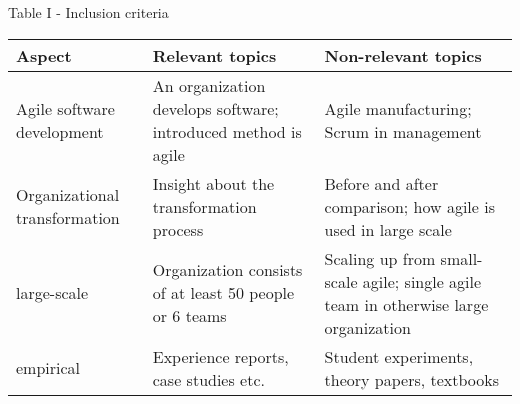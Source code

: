 \centering
Table I - Inclusion criteria

\begin{tabular}{p{10em} p{16em} p{16em}}
	\bfseries{Aspect} & \bfseries{Relevant topics} & \bfseries{Non-relevant topics} \\
	\hline
	Agile software development & An organization develops software; introduced
	method is agile & Agile manufacturing; Scrum in management \\
	\hline
	Organizational transformation & Insight about the transformation process &
	Before and after comparison; how agile is used in large scale \\
	\hline
	large-scale & Organization consists of at least 50 people or 6 teams &
	Scaling up from small-scale agile; single agile team in otherwise large
	organization \\
	\hline
	empirical & Experience reports, case studies etc. & Student experiments,
	theory papers, textbooks \\
\end{tabular}

\raggedright
